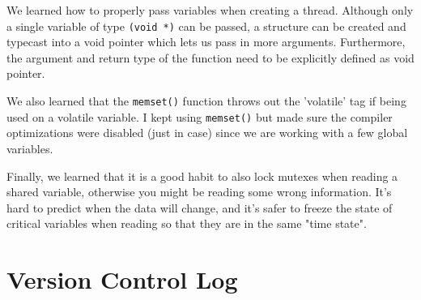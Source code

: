 \documentclass[10pt,letterpaper,draftclsnofoot,onecolumn]{IEEEtran}
\begin{document}
\noindent We learned how to properly pass variables when creating a thread. Although only a single variable of type \texttt{(void *)} can be passed, a structure can be created and typecast into a void pointer which lets us pass in more arguments. Furthermore, the argument and return type of the function need to be explicitly defined as void pointer.\par
\medskip

\medskip

\noindent We also learned that the \texttt{memset()} function throws out the 'volatile' tag if being used on a volatile variable. I kept using \texttt{memset()} but made sure the compiler optimizations were disabled (just in case) since we are working with a few global variables.\par
\medskip

\medskip

\noindent Finally, we learned that it is a good habit to also lock mutexes when reading a shared variable, otherwise you might be reading some wrong information. It's hard to predict when the data will change, and it's safer to freeze the state of critical variables when reading so that they are in the same "time state".\par\pagebreak

\section{Version Control Log}
\bigskip
\end{document}
